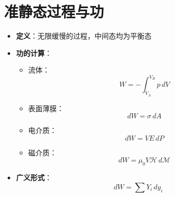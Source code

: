 \documentclass[12pt]{article}
\begin{document}
\section{准静态过程与功}
\begin{itemize}
    \item \textbf{定义}：无限缓慢的过程，中间态均为平衡态
    \item \textbf{功的计算}：
    \begin{itemize}
        \item 流体：
        \begin{equation}
            W = -\int_{V_A}^{V_B} p \, dV
        \end{equation}
        \item 表面薄膜：
        \begin{equation}
            dW = \sigma \, dA
        \end{equation}
        \item 电介质：
        \begin{equation}
            dW = V E \, dP
        \end{equation}
        \item 磁介质：
        \begin{equation}
            dW = \mu_0 V \mathcal{H} \, d\mathcal{M}
        \end{equation}
    \end{itemize}
    \item \textbf{广义形式}：
    \begin{equation}
        dW = \sum Y_i \, dy_i
    \end{equation}
\end{itemize}

\end{document}
